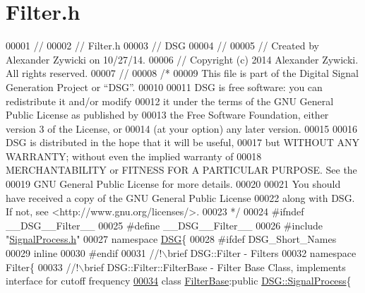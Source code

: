 \hypertarget{_filter_8h_source}{\section{Filter.\+h}
\label{_filter_8h_source}
}

\begin{DoxyCode}
00001 \textcolor{comment}{//}
00002 \textcolor{comment}{//  Filter.h}
00003 \textcolor{comment}{//  DSG}
00004 \textcolor{comment}{//}
00005 \textcolor{comment}{//  Created by Alexander Zywicki on 10/27/14.}
00006 \textcolor{comment}{//  Copyright (c) 2014 Alexander Zywicki. All rights reserved.}
00007 \textcolor{comment}{//}
00008 \textcolor{comment}{/*}
00009 \textcolor{comment}{ This file is part of the Digital Signal Generation Project or “DSG”.}
00010 \textcolor{comment}{}
00011 \textcolor{comment}{ DSG is free software: you can redistribute it and/or modify}
00012 \textcolor{comment}{ it under the terms of the GNU General Public License as published by}
00013 \textcolor{comment}{ the Free Software Foundation, either version 3 of the License, or}
00014 \textcolor{comment}{ (at your option) any later version.}
00015 \textcolor{comment}{}
00016 \textcolor{comment}{ DSG is distributed in the hope that it will be useful,}
00017 \textcolor{comment}{ but WITHOUT ANY WARRANTY; without even the implied warranty of}
00018 \textcolor{comment}{ MERCHANTABILITY or FITNESS FOR A PARTICULAR PURPOSE.  See the}
00019 \textcolor{comment}{ GNU General Public License for more details.}
00020 \textcolor{comment}{}
00021 \textcolor{comment}{ You should have received a copy of the GNU General Public License}
00022 \textcolor{comment}{ along with DSG.  If not, see <http://www.gnu.org/licenses/>.}
00023 \textcolor{comment}{ */}
00024 \textcolor{preprocessor}{#ifndef \_\_DSG\_\_Filter\_\_}
00025 \textcolor{preprocessor}{#define \_\_DSG\_\_Filter\_\_}
00026 \textcolor{preprocessor}{#include "\hyperlink{_signal_process_8h}{SignalProcess.h}"}
00027 \textcolor{keyword}{namespace }\hyperlink{namespace_d_s_g}{DSG}\{
00028 \textcolor{preprocessor}{#ifdef DSG\_Short\_Names}
00029     \textcolor{keyword}{inline}
00030 \textcolor{preprocessor}{#endif}
00031 \textcolor{comment}{    //!\(\backslash\)brief DSG::Filter - Filters}
00032 \textcolor{comment}{}    \textcolor{keyword}{namespace }Filter\{\textcolor{comment}{}
00033 \textcolor{comment}{        //!\(\backslash\)brief DSG::Filter::FilterBase - Filter Base Class, implements interface for cutoff frequency}
\hypertarget{_filter_8h_source_l00034}{}\hyperlink{class_d_s_g_1_1_filter_1_1_filter_base}{00034} \textcolor{comment}{}        \textcolor{keyword}{class }\hyperlink{class_d_s_g_1_1_filter_1_1_filter_base}{FilterBase}:\textcolor{keyword}{public} \hyperlink{class_d_s_g_1_1_signal_process}{DSG::SignalProcess}\{

\end{DoxyCode}
